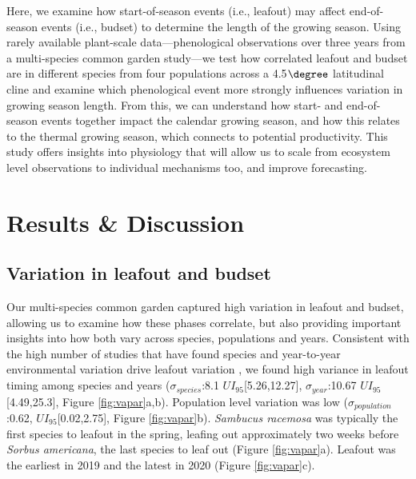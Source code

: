 \documentclass{article}[12pt]
\begin{document}
Here, we examine how start-of-season events (i.e., leafout) may affect end-of-season events (i.e., budset) to determine the length of the growing season. Using rarely available plant-scale data---phenological observations over three years from a multi-species common garden study---we test how correlated leafout and budset are in different species from four populations across a 4.5$\degree$ latitudinal cline and examine which phenological event more strongly influences variation in growing season length. From this, we can understand how start- and end-of-season events together impact the calendar growing season, and how this relates to the thermal growing season, which connects to potential productivity. This study offers insights into physiology that will allow us to scale from ecosystem level observations to individual mechanisms too, and improve forecasting. %

\section{Results \& Discussion} 
\subsection{Variation in leafout and budset}
Our multi-species common garden captured high variation in leafout and budset, %
allowing us to examine how these phases correlate, but also providing important insights into how both vary across species, populations and years. Consistent with the high number of studies that have found species and year-to-year environmental variation drive leafout variation \citep{delpierre2024, donnelly2017, polgar2011}, we found high variance in leafout timing among species and years ($\sigma_{species}$:8.1 $UI_{95}$[5.26,12.27], $\sigma_{year}$:10.67 $UI_{95}$[4.49,25.3], Figure \ref{fig:vapar}a,b). Population level variation was low ($\sigma_{population}$:0.62, $UI_{95}$[0.02,2.75], Figure \ref{fig:vapar}b). \emph{Sambucus racemosa} was typically the first species to leafout in the spring, leafing out approximately two weeks before \emph{Sorbus americana}, the last species to leaf out (Figure \ref{fig:vapar}a). %
Leafout was the earliest in 2019 and the latest in 2020 (Figure \ref{fig:vapar}c). 
\end{document}
